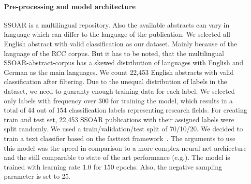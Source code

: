 \paragraph{Pre-processing and model architecture}
SSOAR is a multilingual repository.
Also the available abstracts can vary in language which can differ to the language of the publication.
We selected all English abstract with valid classification as our dataset.
Mainly because of the language of the RCC corpus.
But it has to be noted, that the multilingual SSOAR-abstract-corpus has a skewed distribution of languages with English and German as the main languages.
We count 22,453 English abstracts with valid classification after filtering.
Due to the unequal distribution of labels in the dataset, we need to guaranty enough training data for each label.
We selected only labels with frequency over 300 for training the model, which results in a total of 44 out of 154 classification labels representing research fields.
For creating train and test set, 22,453 SSOAR publications with their assigned labels were split randomly.
We used a train/validation/test split of 70/10/20.
We decided to train a text classifier based on the fasttext framework~\cite{joulin2017bag}.
The arguments to use this model was the speed in comparison to a more complex neural net archiecture and the still comparable to state of the art performance (e.g.\cite{wang2018joint}).
The model is trained with learning rate 1.0 for 150 epochs.
Also, the negative sampling parameter is set to 25.


